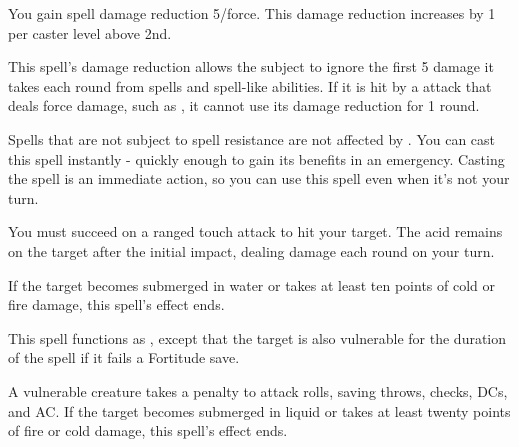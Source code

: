 \spellrng{\rngpers}
\begin{spelleffect}
  You gain spell damage reduction 5/force. This damage reduction increases by 1 per caster level above 2nd.
\end{spelleffect}
\begin{spellnotes}
  This spell's damage reduction allows the subject to ignore the first 5 damage it takes each round from spells and spell-like abilities. If it is hit by a attack that deals force damage, such as , it cannot use its damage reduction for 1 round.
  
  Spells that are not subject to spell resistance are not affected by . You can cast this spell instantly - quickly enough to gain its benefits in an emergency. Casting the spell is an immediate action, so you can use this spell even when it's not your turn.
\end{spellnotes}

\spellrng{\rngmed}
\begin{spelleffect}
  You must succeed on a ranged touch attack to hit your target. The acid remains on the target after the initial impact, dealing damage each round on your turn.
\end{spelleffect}
\begin{spellnotes}
  If the target becomes submerged in water or takes at least ten points of cold or fire damage, this spell's effect ends.
\end{spellnotes}


\spellrng{\rngfar}
\begin{spelleffect}
  This spell functions as , except that the target is also vulnerable for the duration of the spell if it fails a Fortitude save.
\end{spelleffect}
\begin{spellnotes}
  A vulnerable creature takes a  penalty to attack rolls, saving throws, checks, DCs, and AC. If the target becomes submerged in liquid or takes at least twenty points of fire or cold damage, this spell's effect ends.
\end{spellnotes}

